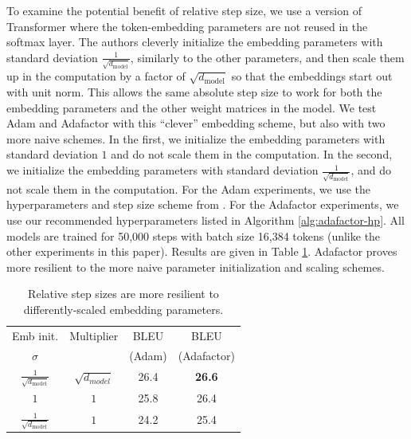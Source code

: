 \documentclass{article}
\begin{document}
To examine the potential benefit of relative step size,  we use a version of Transformer \cite{Vaswani17Attention} where the token-embedding parameters are not reused in the softmax layer.  The authors cleverly initialize the embedding parameters with standard deviation $\frac{1}{\sqrt{d_\mathrm{model}}}$, similarly to the other parameters, and then scale them up in the computation by a factor of $\sqrt{d_\mathrm{model}}$ so that the embeddings start out with unit norm.  This allows the same absolute step size to work for both the embedding parameters and the other weight matrices in the model.  We test Adam and Adafactor with this ``clever'' embedding scheme, but also with two more naive schemes.   In the first, we initialize the embedding parameters with standard deviation $1$ and do not scale them in the computation.  In the second, we initialize the embedding parameters with standard deviation $\frac{1}{\sqrt{d_\mathrm{model}}}$, and do not scale them in the computation.  For the Adam experiments, we use the hyperparameters and step size scheme from \citet{Vaswani17Attention}.  For the Adafactor experiments, we use our recommended hyperparameters listed in Algorithm \ref{alg:adafactor-hp}.  All models are trained for 50,000 steps with batch size 16,384 tokens (unlike the other experiments in this paper).  Results are given in Table \ref{tab:relative}.  Adafactor proves more resilient to the more naive parameter initialization and scaling schemes.


\begin{table}[t]
\caption{Relative step sizes are more resilient to differently-scaled embedding parameters.}
\label{tab:relative}
\vskip 0.15in
\begin{center}
\begin{small}
\begin{tabular}{cc|cc}
\toprule
Emb init.& Multiplier & BLEU & BLEU \\
$\sigma$ &   & (Adam) & (Adafactor) \\
\midrule
$\frac{1}{\sqrt{d_\mathrm{model}}}$  & $\sqrt{d_{model}}$ & 26.4 & \textbf{26.6} \\
$1$ & $1$ & 25.8 & 26.4 \\
$\frac{1}{\sqrt{d_\mathrm{model}}}$  & $1$  & 24.2 & 25.4 \\
\bottomrule
\end{tabular}
\end{small}
\end{center}
\vskip -0.1in
\end{table}
\end{document}
